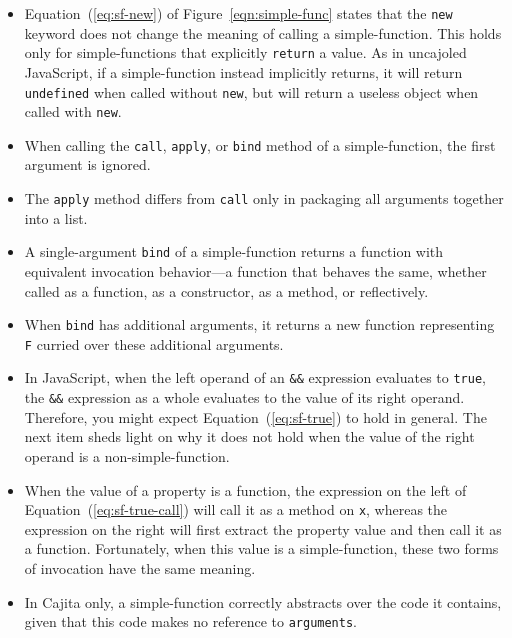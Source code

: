 \documentclass[letterpaper,twocolumn,10pt]{article}
\newcommand{\code}[1]{{\tt {#1}}}              %
\begin{document}
\begin{itemize}
  \item Equation~(\ref{eq:sf-new}) of Figure~\ref{eqn:simple-func} states that the \code{new} keyword does not change 
  the meaning of calling a simple-function. This holds only for simple-functions that explicitly \code{return} a 
  value. As in uncajoled JavaScript, if a simple-function instead implicitly returns, it will return \code{undefined}
  when called without \code{new}, but will return a useless object when called with \code{new}.
  
  \item When calling the \code{call}, \code{apply}, or \code{bind} method of a simple-function, the first argument is 
  ignored.
  
  \item The \code{apply} method differs from \code{call} only in packaging all arguments together into a list.
  
  \item A single-argument \code{bind} of a simple-function returns a function with equivalent invocation behavior---a 
  function that behaves the same, whether called as a function, as a constructor, as a method, or reflectively.
  
  \item When \code{bind} has additional arguments, it returns a new function representing \code{F} curried over these 
  additional arguments.
  
  \item In JavaScript, when the left operand of an \code{\&\&} expression evaluates to \code{true}, the \code{\&\&} 
  expression as a whole evaluates to the value of its right operand. Therefore, you might expect 
  Equation~(\ref{eq:sf-true}) to hold in general. The next item sheds light on why it does not hold when the value of 
  the right operand is a non-simple-function.

  \item When the value of a property is a function, the expression on the left of Equation~(\ref{eq:sf-true-call}) 
  will call it as a method on \code{x}, whereas the expression on the right will first extract the property 
  value and then call it as a function. Fortunately, when this value is a simple-function, these two forms of 
  invocation have the same meaning.

  \item In Cajita only, a simple-function correctly abstracts over the code it contains, given that this code makes 
  no reference to \code{arguments}.
  
\end{itemize}
\end{document}
